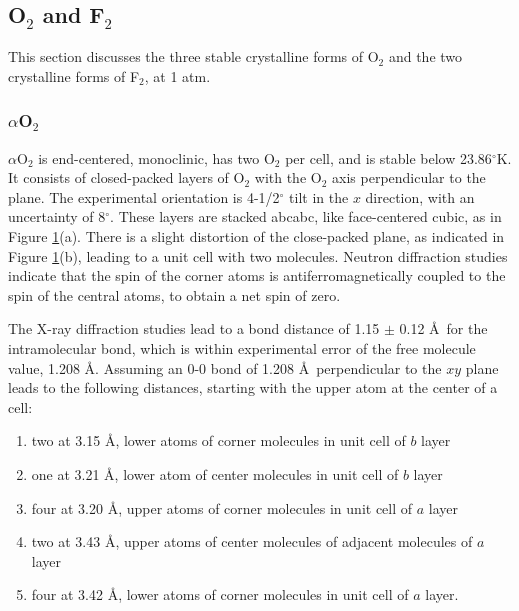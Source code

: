 \subsection{O$_2$ and F$_2$}

This section discusses the three stable crystalline forms of O$_2$ and 
the two crystalline forms of F$_2$, at 1 atm.

\subsubsection{$\alpha$O$_2$}

$\alpha$O$_2$ is end-centered, monoclinic, has two O$_2$ per cell, and
is stable below 23.86$^{\circ}$K.  It consists of closed-packed layers
of O$_2$ with the O$_2$ axis perpendicular to the plane.  The
experimental orientation is 4-1/2$^{\circ}$ tilt in the $x$ direction,
with an uncertainty of 8$^{\circ}$.  These layers are stacked abcabc,
like face-centered cubic, as in Figure \ref{chap9-fig16}(a).  There is
a slight distortion of the close-packed plane, as indicated in Figure
\ref{chap9-fig16}(b), leading to a unit cell with two molecules.
Neutron diffraction studies indicate that the spin of the corner atoms
is antiferromagnetically coupled to the spin of the central atoms, to
obtain a net spin of zero.


\begin{figure}
\caption{}
\label{chap9-fig16}
\end{figure}

The X-ray diffraction studies lead to a bond distance of 1.15 $\pm$ 
0.12 \AA\ for the intramolecular bond, which is within experimental 
error of the free molecule value, 1.208 \AA.  Assuming an 0-0 bond of
1.208 \AA\ perpendicular to the $xy$ plane leads to the following distances, 
starting with the upper atom at the center of a cell:
\begin{enumerate}
\item two at 3.15 \AA, lower atoms of corner molecules in unit cell 
of $b$ layer

\item one at 3.21 \AA, lower atom of center molecules in unit cell of 
$b$ layer

\item four at 3.20 \AA, upper atoms of corner molecules in unit cell 
of $a$ layer

\item two at 3.43 \AA, upper atoms of center molecules of adjacent 
molecules of $a$ layer

\item four at 3.42 \AA, lower atoms of corner molecules in unit cell 
of $a$ layer.
\end{enumerate}

